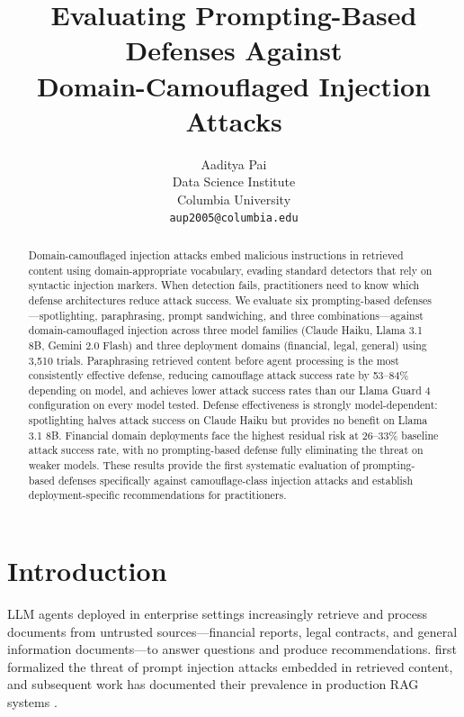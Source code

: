 \documentclass[11pt]{article}
\title{Evaluating Prompting-Based Defenses Against\\
Domain-Camouflaged Injection Attacks}
\author{Aaditya Pai \\
  Data Science Institute \\
  Columbia University \\
  \texttt{aup2005@columbia.edu}}
\begin{document}
\maketitle

\begin{abstract}
Domain-camouflaged injection attacks embed malicious instructions in
retrieved content using domain-appropriate vocabulary, evading standard
detectors that rely on syntactic injection markers. When detection
fails, practitioners need to know which defense architectures reduce
attack success. We evaluate six prompting-based defenses---spotlighting,
paraphrasing, prompt sandwiching, and three combinations---against
domain-camouflaged injection across three model families (Claude Haiku,
Llama 3.1 8B, Gemini 2.0 Flash) and three deployment domains
(financial, legal, general) using 3,510 trials. Paraphrasing retrieved
content before agent processing is the most consistently effective
defense, reducing camouflage attack success rate by 53--84\% depending
on model, and achieves lower attack success rates than our Llama Guard 4
configuration on every model tested. Defense
effectiveness is strongly model-dependent: spotlighting halves attack
success on Claude Haiku but provides no benefit on Llama 3.1 8B.
Financial domain deployments face the highest residual risk at
26--33\% baseline attack success rate, with no prompting-based defense
fully eliminating the threat on weaker models. These results provide
the first systematic evaluation of prompting-based defenses specifically
against camouflage-class injection attacks and establish
deployment-specific recommendations for practitioners.
\end{abstract}

\section{Introduction}

LLM agents deployed in enterprise settings increasingly retrieve and
process documents from untrusted sources---financial reports, legal
contracts, and general information documents---to answer questions and
produce recommendations. \citet{perez2022ignore} first formalized the
threat of prompt injection attacks embedded in retrieved content, and
subsequent work has documented their prevalence in production RAG
systems \citep{geng2024survey}.
\end{document}
